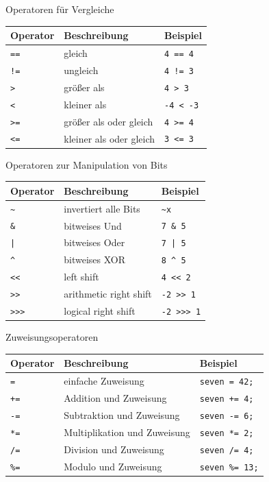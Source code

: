 \documentclass[18pt]{beamer}
\begin{document}
\begin{frame}{Operatoren für Vergleiche}
    \center
    \begin{tabular}{l | l | l}
        \textbf{Operator} & \textbf{Beschreibung} & \textbf{Beispiel} \\
        \hline
        \texttt{==} & gleich & \texttt{4 == 4} \\
        \texttt{!=} & ungleich & \texttt{4 != 3} \\
        \texttt{>} & größer als & \texttt{4 > 3} \\
        \texttt{<} & kleiner als & \texttt{-4 < -3} \\
        \texttt{>=} & größer als oder gleich & \texttt{4 >= 4} \\
        \texttt{<=} & kleiner als oder gleich & \texttt{3 <= 3} \\
    \end{tabular}
\end{frame}

\begin{frame}{Operatoren zur Manipulation von Bits}
    \center
    \begin{tabular}{l | l | l}
        \textbf{Operator} & \textbf{Beschreibung} & \textbf{Beispiel} \\
        \hline
        \texttt{\textasciitilde} & invertiert alle Bits & \texttt{\textasciitilde x} \\
        \texttt{\&} & bitweises Und & \texttt{7 \& 5} \\
        \texttt{|} & bitweises Oder & \texttt{7 | 5} \\
        \texttt{\textasciicircum} & bitweises XOR & \texttt{8 \textasciicircum ~5} \\
        \hline
        \texttt{<<} & left shift & \texttt{4 << 2} \\
        \texttt{>>} & arithmetic right shift & \texttt{-2 >> 1} \\
        \texttt{>>>} & logical right shift & \texttt{-2 >>> 1} \\
    \end{tabular}
\end{frame}

\begin{frame}{Zuweisungsoperatoren}
    \center
    \begin{tabular}{l | l | l}
        \textbf{Operator} & \textbf{Beschreibung} & \textbf{Beispiel} \\
        \hline
        \texttt{=} & einfache Zuweisung & \texttt{seven = 42;} \\
        \texttt{+=} & Addition und Zuweisung & \texttt{seven += 4;} \\
        \texttt{-=} & Subtraktion und Zuweisung & \texttt{seven -= 6;} \\
        \texttt{*=} & Multiplikation und Zuweisung & \texttt{seven *= 2;} \\
        \texttt{/=} & Division und Zuweisung & \texttt{seven /= 4;} \\
        \texttt{\%=} & Modulo und Zuweisung & \texttt{seven \%= 13;} \\
    \end{tabular}
\end{frame}
\end{document}

